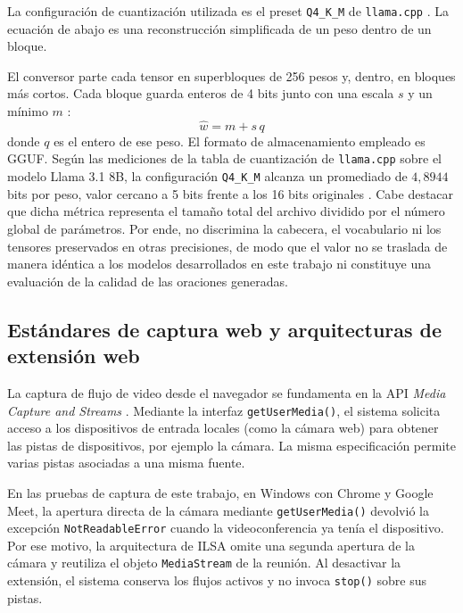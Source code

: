 La configuración de cuantización utilizada es el preset \texttt{Q4\_K\_M} de \texttt{llama.cpp} \parencite{gerganov2023llamacpp}. La ecuación de abajo es una reconstrucción simplificada de un peso dentro de un bloque.

El conversor parte cada tensor en superbloques de 256 pesos y, dentro, en bloques más cortos. Cada bloque guarda enteros de 4 bits junto con una escala $s$ y un mínimo $m$ \parencite{ggml2023kquants}:
\begin{equation}
\hat{w} = m + s\, q
\label{eq:reconstruccion_q4k}
\end{equation}
donde $q$ es el entero de ese peso.
El formato de almacenamiento empleado es GGUF. Según las mediciones de la tabla de cuantización de \texttt{llama.cpp} sobre el modelo Llama 3.1 8B, la configuración \texttt{Q4\_K\_M} alcanza un promediado de $4{,}8944$ bits por peso, valor cercano a 5 bits frente a los 16 bits originales \parencite{gerganov2023llamacpp}. Cabe destacar que dicha métrica representa el tamaño total del archivo dividido por el número global de parámetros. Por ende, no discrimina la cabecera, el vocabulario ni los tensores preservados en otras precisiones, de modo que el valor no se traslada de manera idéntica a los modelos desarrollados en este trabajo ni constituye una evaluación de la calidad de las oraciones generadas.



\subsection{Estándares de captura web y arquitecturas de extensión web}

La captura de flujo de video desde el navegador se fundamenta en la API \textit{Media Capture and Streams} \parencite{w3c2024mediacapturestreams}. Mediante la interfaz \texttt{getUserMedia()}, el sistema solicita acceso a los dispositivos de entrada locales (como la cámara web) para obtener las pistas de dispositivos, por ejemplo la cámara. La misma especificación permite varias pistas asociadas a una misma fuente.

En las pruebas de captura de este trabajo, en Windows con Chrome y Google Meet, la apertura directa de la cámara mediante \texttt{getUserMedia()} devolvió la excepción \texttt{NotReadableError} cuando la videoconferencia ya tenía el dispositivo. Por ese motivo, la arquitectura de ILSA omite una segunda apertura de la cámara y reutiliza el objeto \texttt{MediaStream} de la reunión. Al desactivar la extensión, el sistema conserva los flujos activos y no invoca \texttt{stop()} sobre sus pistas.

